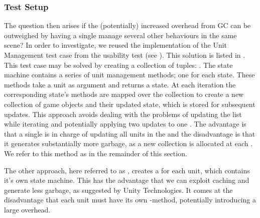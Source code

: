 \subsubsection{Test Setup}
The question then arises if the (potentially) increased overhead from \gls{GC} can be outweighed by having a single  manage several other behaviours in the same scene? In order to investigate, we reused the implementation of the Unit Management test case from the usability test (see ). This solution is listed in . This test case may be solved by creating a collection of tuples: . The state machine contains a series of unit management methods; one for each state. These methods take a unit as argument and returns a state. At each iteration the corresponding state's methods are mapped over the collection to create a new collection of game objects and their updated state, which is stored for subsequent updates. This approach avoids dealing with the problems of updating the list while iterating and potentially applying two updates to one . The advantage is that a single  is in charge of updating all units in the  and the disadvantage is that it generates substantially more garbage, as a new collection is allocated at each . We refer to this method as  in the remainder of this section.

The other approach, here referred to as , creates a  for each unit, which contains it's own state machine. This has the advantage that we can exploit caching and generate less garbage, as suggested by Unity Technologies\cite{unity:optimisation}. It comes at the disadvantage that each unit must have its own -method, potentially introducing a large overhead\cite{unity:runtime:calls}.

